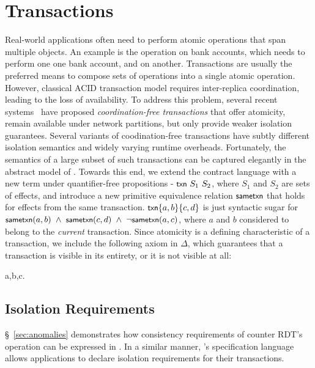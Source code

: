 \section{Transactions}
\label{sec:transactions}

Real-world applications often need to perform atomic operations that
span multiple objects. An example is the  operation on
bank accounts, which needs to perform  one one bank
account, and  on another. Transactions are usually the
preferred means to compose sets of operations into a single atomic
operation. However, classical ACID transaction model requires
inter-replica coordination, leading to the loss of availability. To
address this problem, several recent
systems~\cite{Walter,Burckhardt2012,BailisHAT} have proposed
\emph{coordination-free transactions} that offer atomicity, remain
available under network partitions, but only provide weaker isolation
guarantees. Several variants of coodination-free transactions have
subtly different isolation semantics and widely varying runtime
overheads.  Fortunately, the semantics of a large subset of such
transactions can be captured elegantly in the abstract model of \name.
Towards this end, we extend the contract language with a new term
under quantifier-free propositions - ${\small {\normalfont \textsf{txn}}}~S_1~S_2$, where
$S_1$ and $S_2$ are sets of effects, and introduce a new primitive
equivalence relation $\small {\normalfont \textsf{sametxn}}$ that holds for effects from
the same transaction. $\small {\normalfont \textsf{txn}}\{a,b\}\{c,d\}$ is just syntactic sugar
for $\small {\normalfont \textsf{sametxn}(a,b)} ~\wedge~ {\normalfont \textsf{sametxn}(c,d)} ~\wedge~
\neg{\normalfont \textsf{sametxn}(a,c)}$, where $a$ and $b$ considered to belong to the
\emph{current} transaction. Since atomicity is a defining
characteristic of a transaction, we include the following axiom in
$\Delta$, which guarantees that a transaction is visible in its
entirety, or it is not visible at all:

\begin{cmathpar}
\forall a,b,c.~ ~\wedge~  ~\wedge~ 
\Rightarrow {}
\end{cmathpar}

\subsection{Isolation Requirements}

\S~\ref{sec:anomalies} demonstrates how consistency requirements of
counter RDT's  operation can be expressed in \name. In a
similar manner, \name's specification language allows applications to
declare isolation requirements for their transactions.

